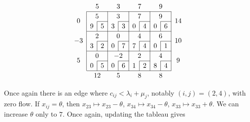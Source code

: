 \[
	\arraycolsep=5pt\def\arraystretch{1.2}
	\begin{array}{c|c|c|c|c|c|c|c|c|c}
		\multicolumn{1}{c}{}           & \multicolumn{2}{c}{5}              & \multicolumn{2}{c}{3}              & \multicolumn{2}{c}{7}              & \multicolumn{2}{c}{9}              & \multicolumn{1}{c}{}                                                          \\\cline{2-9}
		\multirow{2}{*}{\(0\)} & \multicolumn{2}{c|}{5} & \multicolumn{2}{c|}{3} & \multicolumn{2}{c|}{7} & \multicolumn{2}{c|}{9} & \multirow{2}{*}{\(14\)}                                                      \\\cline{3-3}\cline{5-5}\cline{7-7}\cline{9-9}
		                               & \multicolumn{1}{c|}{9}            & 5                                 & \multicolumn{1}{c|}{3}            & 3                                 & \multicolumn{1}{c|}{0} & 4 & \multicolumn{1}{c|}{0} & 6 & \\\cline{2-9}
		\multirow{2}{*}{\(-3\)} & \multicolumn{2}{c|}{2} & \multicolumn{2}{c|}{0} & \multicolumn{2}{c|}{4} & \multicolumn{2}{c|}{6} & \multirow{2}{*}{\(10\)}                                                      \\\cline{3-3}\cline{5-5}\cline{7-7}\cline{9-9}
		                               & \multicolumn{1}{c|}{3}            & 2                                 & \multicolumn{1}{c|}{0}            & 7                                 & \multicolumn{1}{c|}{7} & 4 & \multicolumn{1}{c|}{0} & 1 & \\\cline{2-9}
		\multirow{2}{*}{\(5\)} & \multicolumn{2}{c|}{0} & \multicolumn{2}{c|}{-2} & \multicolumn{2}{c|}{2} & \multicolumn{2}{c|}{4} & \multirow{2}{*}{\(9\)}                                                      \\\cline{3-3}\cline{5-5}\cline{7-7}\cline{9-9}
		                               & \multicolumn{1}{c|}{0}            & 5                                 & \multicolumn{1}{c|}{0}            & 6                                 & \multicolumn{1}{c|}{1} & 2 & \multicolumn{1}{c|}{8} & 4 & \\\cline{2-9}
		\multicolumn{1}{c}{}           & \multicolumn{2}{c}{12}                & \multicolumn{2}{c}{5}                & \multicolumn{2}{c}{8}                & \multicolumn{2}{c}{8}                & \multicolumn{1}{c}{}
	\end{array}
\]

\noindent Once again there is an edge where \( c_{ij} < \lambda_i + \mu_j \), notably \((i,j) = (2,4)\), with zero flow.
If \( x_{ij} = \theta \), then \( x_{23} \mapsto x_{23} - \theta \), \( x_{34} \mapsto x_{34} - \theta \), \( x_{33} \mapsto x_{33} + \theta \).
We can increase \( \theta \) only to \( 7 \).
Once again, updating the tableau gives

